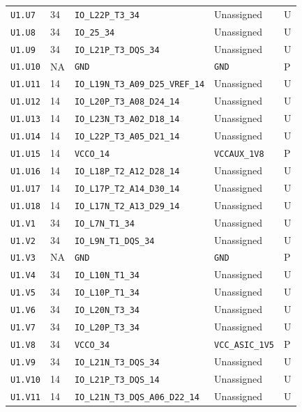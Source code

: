 \documentclass[11pt,a4paper]{article}
\begin{document}
\begin{longtable}{@{}P{20mm}P{10mm}P{75mm}P{49mm}P{7mm}@{}}
\nolinkurl{U1.U7} & 34 & \nolinkurl{IO_L22P_T3_34} & Unassigned & U \\
\nolinkurl{U1.U8} & 34 & \nolinkurl{IO_25_34} & Unassigned & U \\
\nolinkurl{U1.U9} & 34 & \nolinkurl{IO_L21P_T3_DQS_34} & Unassigned & U \\
\nolinkurl{U1.U10} & NA & \nolinkurl{GND} & \nolinkurl{GND} & P \\
\nolinkurl{U1.U11} & 14 & \nolinkurl{IO_L19N_T3_A09_D25_VREF_14} & Unassigned & U \\
\nolinkurl{U1.U12} & 14 & \nolinkurl{IO_L20P_T3_A08_D24_14} & Unassigned & U \\
\nolinkurl{U1.U13} & 14 & \nolinkurl{IO_L23N_T3_A02_D18_14} & Unassigned & U \\
\nolinkurl{U1.U14} & 14 & \nolinkurl{IO_L22P_T3_A05_D21_14} & Unassigned & U \\
\nolinkurl{U1.U15} & 14 & \nolinkurl{VCCO_14} & \nolinkurl{VCCAUX_1V8} & P \\
\nolinkurl{U1.U16} & 14 & \nolinkurl{IO_L18P_T2_A12_D28_14} & Unassigned & U \\
\nolinkurl{U1.U17} & 14 & \nolinkurl{IO_L17P_T2_A14_D30_14} & Unassigned & U \\
\nolinkurl{U1.U18} & 14 & \nolinkurl{IO_L17N_T2_A13_D29_14} & Unassigned & U \\
\nolinkurl{U1.V1} & 34 & \nolinkurl{IO_L7N_T1_34} & Unassigned & U \\
\nolinkurl{U1.V2} & 34 & \nolinkurl{IO_L9N_T1_DQS_34} & Unassigned & U \\
\nolinkurl{U1.V3} & NA & \nolinkurl{GND} & \nolinkurl{GND} & P \\
\nolinkurl{U1.V4} & 34 & \nolinkurl{IO_L10N_T1_34} & Unassigned & U \\
\nolinkurl{U1.V5} & 34 & \nolinkurl{IO_L10P_T1_34} & Unassigned & U \\
\nolinkurl{U1.V6} & 34 & \nolinkurl{IO_L20N_T3_34} & Unassigned & U \\
\nolinkurl{U1.V7} & 34 & \nolinkurl{IO_L20P_T3_34} & Unassigned & U \\
\nolinkurl{U1.V8} & 34 & \nolinkurl{VCCO_34} & \nolinkurl{VCC_ASIC_1V5} & P \\
\nolinkurl{U1.V9} & 34 & \nolinkurl{IO_L21N_T3_DQS_34} & Unassigned & U \\
\nolinkurl{U1.V10} & 14 & \nolinkurl{IO_L21P_T3_DQS_14} & Unassigned & U \\
\nolinkurl{U1.V11} & 14 & \nolinkurl{IO_L21N_T3_DQS_A06_D22_14} & Unassigned & U \\

\end{longtable}
\end{document}
